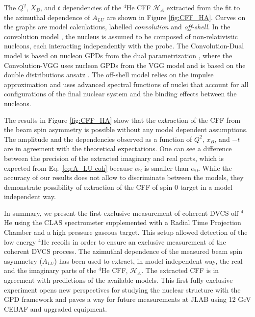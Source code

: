 \documentclass[twocolumn,nofootinbib,showpacs,prl,superscriptaddress,secnumarabic,amssymb,nobibnotes,aps,floatfix]{revtex4}
\begin{document}
The $Q^2$, $X_B$, and $t$ dependencies of the $^4$He CFF $\mathcal{H}_A$ 
extracted from the fit to the azimuthal dependence of $A_{LU}$ are shown in 
Figure \ref{fig:CFF_HA}. Curves on the graphs are model calculations, labelled 
{\it convolution} and {\it off-shell}. In the convolution model 
\cite{Vadim_priv}, the nucleus is assumed to be composed of non-relativistic 
nucleons, each interacting independently with 
the probe. The Convolution-Dual model is based on nucleon GPDs from the dual 
parametrization \cite{Guzey:2006xi}, where the Convolution-VGG uses nucleon 
GPDs  from the VGG model and is based on the double distributions ansatz 
\cite{DD_model}. The off-shell model \cite{GonzalezHernandez:2012jv} relies on 
the impulse approximation and uses advanced spectral functions of  nuclei that 
account for all configurations of the final nuclear system and the binding 
effects between the nucleons.

The results in Figure \ref{fig:CFF_HA} show that the extraction of the CFF
from the beam spin asymmetry is possible without any model dependent 
assumptions. The amplitude and the dependencies observed as a function of 
$Q^{2}$, $x_B$, and $-t$ are in agreement 
with the theoretical expectations. One can see a difference between the 
precision of the extracted imaginary and real parts, which is expected from
Eq.~\ref{eq:A_LU-coh} because $\alpha_2$ is smaller than $\alpha_0$. While the 
accuracy of our results does not allow to discriminate between the models, they 
demonstrate possibility of extraction of the CFF of spin 0 target in a model 
independent way.


In summary, we present the first exclusive measurement of coherent DVCS off 
$^4$He using the CLAS spectrometer supplemented with a Radial Time Projection 
Chamber and a high pressure gaseous target. This setup allowed detection of the 
low energy $^4$He recoils in order to ensure an exclusive measurement of the
coherent DVCS process.
The azimuthal dependence of the measured beam spin asymmetry ($A_{LU}$) has 
been used to extract, in model independent way, the real and the imaginary 
parts of the $^4$He CFF, $\mathcal{H}_A$. The extracted CFF is in  
agreement with predictions of the available models. This first fully exclusive 
experiment opens new perspectives for studying the nuclear structure with the 
GPD framework and paves a way for future measurements at JLAB using 12 GeV 
CEBAF and upgraded equipment.

\end{document}
